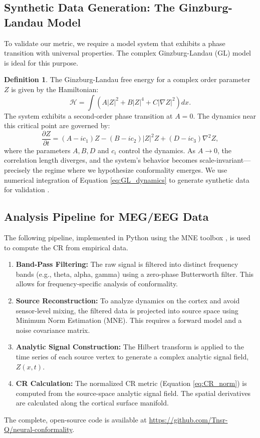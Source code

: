 \documentclass[12pt, reqno]{amsart}
\theoremstyle{definition}
\newtheorem{definition}[theorem]{Definition}
\theoremstyle{remark}
\numberwithin{equation}{section}
\begin{document}
\subsection{Synthetic Data Generation: The Ginzburg-Landau Model}
To validate our metric, we require a model system that exhibits a phase transition with universal properties. The complex Ginzburg-Landau (GL) model is ideal for this purpose.

\begin{definition}
The Ginzburg-Landau free energy for a complex order parameter $Z$ is given by the Hamiltonian:
\begin{equation}
\mathcal{H} = \int \left( A|Z|^2 + B|Z|^4 + C|\nabla Z|^2 \right) dx.
\end{equation}
The system exhibits a second-order phase transition at $A=0$. The dynamics near this critical point are governed by:
\begin{equation}\label{eq:GL_dynamics}
\frac{\partial Z}{\partial t} = (A - i c_1) Z - (B - i c_2) |Z|^2 Z + (D - i c_3) \nabla^2 Z,
\end{equation}
where the parameters $A, B, D$ and $c_i$ control the dynamics. As $A \to 0$, the correlation length diverges, and the system's behavior becomes scale-invariant—precisely the regime where we hypothesize conformality emerges. We use numerical integration of Equation \eqref{eq:GL_dynamics} to generate synthetic data for validation \cite{SciPy}.
\end{definition}

\subsection{Analysis Pipeline for MEG/EEG Data}
The following pipeline, implemented in Python using the MNE toolbox \cite{MNE}, is used to compute the CR from empirical data.

\begin{enumerate}
    \item \textbf{Band-Pass Filtering:} The raw signal is filtered into distinct frequency bands (e.g., theta, alpha, gamma) using a zero-phase Butterworth filter. This allows for frequency-specific analysis of conformality.
    \item \textbf{Source Reconstruction:} To analyze dynamics on the cortex and avoid sensor-level mixing, the filtered data is projected into source space using Minimum Norm Estimation (MNE). This requires a forward model and a noise covariance matrix.
    \item \textbf{Analytic Signal Construction:} The Hilbert transform is applied to the time series of each source vertex to generate a complex analytic signal field, $Z(x,t)$.
    \item \textbf{CR Calculation:} The normalized CR metric (Equation \eqref{eq:CR_norm}) is computed from the source-space analytic signal field. The spatial derivatives are calculated along the cortical surface manifold.
\end{enumerate}
The complete, open-source code is available at \url{https://github.com/Tnsr-Q/neural-conformality}.
\end{document}
